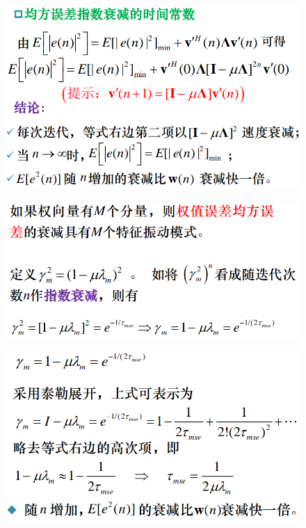 \documentclass[UTF8]{ctexart} %
\begin{document}
			\begin{figure}[H]
				\centering\includegraphics[scale=0.4]{45.png}
			\end{figure}
			\begin{figure}[H]
				\centering\includegraphics[scale=0.4]{46.png}
			\end{figure}
			\begin{figure}[H]
				\centering\includegraphics[scale=0.4]{47.png}
			\end{figure}
\end{document}
